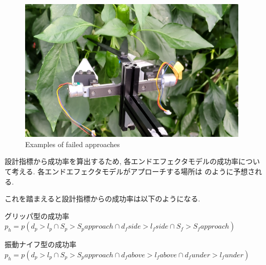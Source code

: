 \begin{figure}[H]
    \centering
    \includegraphics[width=110mm]{images/png/failure.png}
    \caption{Examples of failed approaches}
    \label{Fig:failure}
\end{figure}

設計指標から成功率を算出するため, 各エンドエフェクタモデルの成功率について考える.
各エンドエフェクタモデルがアプローチする場所は のように予想される.

\begin{table}[htbp]
  \begin{center}
    \caption{Approach area of each model}
    \label{Tab:approach}
  \end{center}
\end{table}

これを踏まえると設計指標からの成功率は以下のようになる.

グリッパ型の成功率\\
\vspace{5mm}
$p_h = p(d_p > l_p \cap S_p > S_papproach \cap d_fside > l_fside \cap S_f > S_fapproach)$

振動ナイフ型の成功率\\
\vspace{5mm}
$p_h = p(d_p > l_p \cap S_p > S_papproach \cap d_fabove > l_fabove \cap d_funder > l_funder)$

